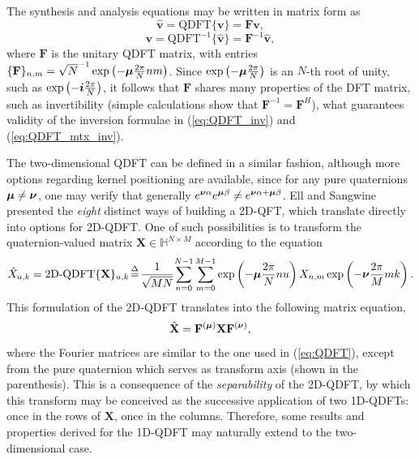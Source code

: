 The synthesis and analysis equations may be written in matrix form as
\begin{equation}
\label{eq:QDFT}
\widehat{\mathbf{v}} = \text{QDFT}\{ \mathbf{v} \} = \mathbf{F} \mathbf{v},
\end{equation}
\begin{equation}
\label{eq:QDFT_mtx_inv}
\mathbf{v} = \text{QDFT}^{-1}\{ \widehat{\mathbf{v}} \} = \mathbf{F}^{-1} \widehat{\mathbf{v}},
\end{equation}
where $ \mathbf{F} $ is the unitary QDFT matrix, with entries $ \{\mathbf{F}\}_{n,m} = \sqrt{N}^{-1} \exp \left( -\boldsymbol{\mu} \frac{2\pi}{N} nm \right)$. Since $ \exp \left( -\boldsymbol{\mu} \frac{2\pi}{N} \right) $ is an $ N $-th root of unity, such as $ \exp \left( -\boldsymbol{i} \frac{2\pi}{N} \right) $, it follows that $ \mathbf{F} $ shares many properties of the DFT matrix, such as invertibility (simple calculations show that $ \mathbf{F}^{-1} = \mathbf{F}^{H} $), what guarantees validity of the inversion formulae in (\ref{eq:QDFT_inv}) and (\ref{eq:QDFT_mtx_inv}).

The two-dimensional QDFT can be defined in a similar fashion, although more options regarding kernel positioning are available, since for any pure quaternions $ \boldsymbol{\mu} \neq \boldsymbol{\nu} $, one may verify that generally $ e^{\boldsymbol{\nu} \alpha} e^{\boldsymbol{\mu} \beta} \neq e^{\boldsymbol{\nu} \alpha + \boldsymbol{\mu} \beta} $. Ell and Sangwine \cite{ell2014quaternion} presented the \textit{eight} distinct ways of building a 2D-QFT, which translate directly into options for 2D-QDFT. One of such possibilities is to transform the quaternion-valued matrix $ \mathbf{X} \in \mathbb{H}^{N\times M}$ according to the equation
\begin{equation}
\label{eq:2DQDFT-01}
\hat{X}_{u,k} = 
\text{2D-QDFT}\{ \mathbf{X} \}_{u,k} \!\overset{\Delta}{=}\! \frac{1}{\sqrt{MN}} \!\sum_{n=0}^{N-1} \sum_{m=0}^{M-1}  \exp \left( -\boldsymbol{\mu} \frac{2\pi}{N} nu \right) X_{n,m} \exp \left( -\boldsymbol{\nu} \frac{2\pi}{M} mk \right).
\end{equation}
This formulation of the 2D-QDFT translates into the following matrix equation,
\begin{equation}
\label{eq:2DQDFT-02}
\hat{\mathbf{X}} = \mathbf{F}^{(\boldsymbol{\mu})} \mathbf{X} \mathbf{F}^{(\boldsymbol{\nu})},
\end{equation}
where the Fourier matrices are similar to the one used in (\ref{eq:QDFT}), except from the pure quaternion which serves as transform axis (shown in the parenthesis). This is a consequence of the \textit{separability} of the 2D-QDFT, by which this transform may be conceived as the successive application of two 1D-QDFTs: once in the rows of $ \mathbf{X} $, once in the columns. Therefore, some results and properties derived for the 1D-QDFT may naturally extend to the two-dimensional case.

